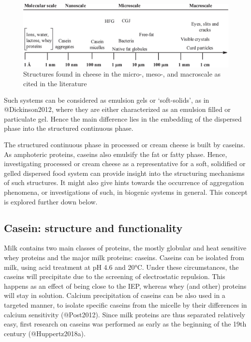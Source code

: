 \documentclass[
]{article}
\begin{document}
\begin{figure}
\includegraphics[width=0.75\linewidth]{images/scales_cheese_Lamichhane2018} \caption{Structures found in cheese in the micro-, meso-, and macroscale as cited in the literature}\label{fig:ch.sc}
\end{figure}

Such systems can be considered as emulsion gels or `soft-solids', as in
@Dickinson2012, where they are either characterized as an emulsion
filled or particulate gel. Hence the main difference lies in the
embedding of the dispersed phase into the structured continuous phase.

The structured continuous phase in processed or cream cheese is built by
caseins. As amphoteric proteins, caseins also emulsify the fat or fatty
phase. Hence, investigating processed or cream cheese as a
representative for a soft, solidified or gelled dispersed food system
can provide insight into the structuring mechanisms of such structures.
It might also give hints towards the occurrence of aggregation
phenomena, or investigations of such, in biogenic systems in general.
This concept is explored further down below.

\subsection{Casein: structure and functionality}

Milk contains two main classes of proteins, the mostly globular and heat
sensitive whey proteins and the major milk proteins: caseins. Caseins
can be isolated from milk, using acid treatment at pH 4.6 and 20°C.
Under these circumstances, the caseins will precipitate due to the
screening of electrostatic repulsion. This happens as an effect of being
close to the IEP, whereas whey (and other) proteins will stay in
solution. Calcium precipitation of caseins can be also used in a
targeted manner, to isolate specific caseins from the micelle by their
differences in calcium sensitivity (@Post2012). Since milk proteins are
thus separated relatively easy, first research on caseins was performed
as early as the beginning of the 19th century (@Huppertz2018a).
\end{document}
